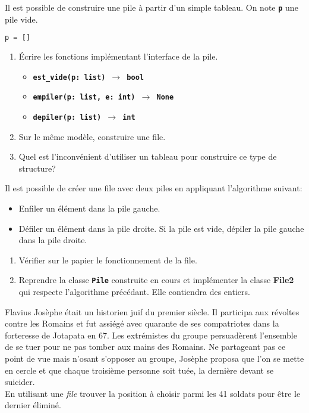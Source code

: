 \documentclass[a4paper,11pt]{article}
\begin{document}
\begin{exo}
    Il est possible de construire une pile à partir d'un simple tableau. On note \textbf{\texttt{p}} une pile vide.
    \begin{lstlisting}[language=Python  , xleftmargin=2em, xrightmargin=2em]
p = []
\end{lstlisting}
    \begin{enumerate}
        \item Écrire les fonctions implémentant l'interface de la pile.
              \begin{itemize}
                  \item \texttt{\textbf{est\_vide(p: list) $\rightarrow$ bool}}
                  \item \texttt{\textbf{empiler(p: list, e: int) $\rightarrow$ None}}
                  \item \texttt{\textbf{depiler(p: list) $\rightarrow$ int}}
              \end{itemize}
        \item Sur le même modèle, construire une file.
        \item Quel est l'inconvénient d'utiliser un tableau pour construire ce type de structure?
    \end{enumerate}

\end{exo}
\begin{exo}
    Il est possible de créer une file avec deux piles en appliquant l'algorithme suivant:
    \begin{itemize}
        \item Enfiler un élément dans la pile gauche.
        \item Défiler un élément dans la pile droite. Si la pile est vide, dépiler la pile gauche dans la pile droite.
    \end{itemize}
    \begin{enumerate}
        \item Vérifier sur le papier le fonctionnement de la file.
        \item Reprendre la classe \textbf{\texttt{Pile}} construite en cours et implémenter la classe \textbf{File2} qui respecte l'algorithme précédant. Elle contiendra des entiers.
    \end{enumerate}
\end{exo}
\begin{exo}
    Flavius Josèphe était un historien juif du premier siècle. Il participa aux révoltes contre les Romains et fut assiégé avec quarante de ses compatriotes dans la forteresse de Jotapata en 67. Les  extrémistes  du  groupe  persuadèrent l’ensemble de se tuer pour ne pas  tomber  aux  mains  des  Romains.  Ne partageant  pas  ce  point  de  vue  mais  n’osant  s’opposer  au groupe,  Josèphe  proposa  que  l’on  se  mette  en  cercle  et  que  chaque  troisième  personne  soit  tuée,  la  dernière devant  se  suicider.\\
    En utilisant une \emph{file} trouver la position à choisir parmi les 41 soldats pour être le dernier éliminé.
\end{exo}
\end{document}
